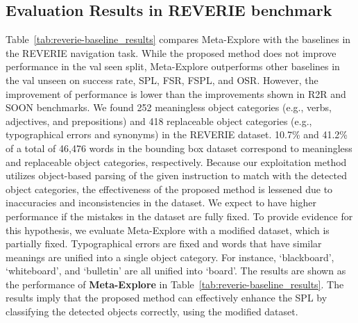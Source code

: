 \documentclass[10pt,twocolumn,letterpaper]{article}
\begin{document}
\subsection{Evaluation Results in REVERIE benchmark}
Table~\ref{tab:reverie-baseline_results} compares Meta-Explore with the baselines in the REVERIE navigation task. While the proposed method does not improve performance in the val seen split, Meta-Explore outperforms other baselines in the val unseen on success rate, SPL, FSR, FSPL, and OSR. However, the improvement of performance is lower than the improvements shown in R2R and SOON benchmarks. We found 252 meaningless object categories (e.g., verbs, adjectives, and prepositions) and 418 replaceable object categories (e.g., typographical errors and synonyms) in the REVERIE dataset. 10.7\% and 41.2\% of a total of 46,476 words in the bounding box dataset correspond to meaningless and replaceable object categories, respectively. Because our exploitation method utilizes object-based parsing of the given instruction to match with the detected object categories, the effectiveness of the proposed method is lessened due to inaccuracies and inconsistencies in the dataset. We expect to have higher performance if the mistakes in the dataset are fully fixed. 
To provide evidence for this hypothesis, we evaluate Meta-Explore with a modified dataset, which is partially fixed. Typographical errors are fixed and words that have similar meanings are unified into a single object category. For instance, `blackboard', `whiteboard', and `bulletin' are all unified into `board'. The results are shown as the performance of \textbf{Meta-Explore} in Table~\ref{tab:reverie-baseline_results}. The results imply that the proposed method can effectively enhance the SPL by classifying the detected objects correctly, using the modified dataset. 
\end{document}

